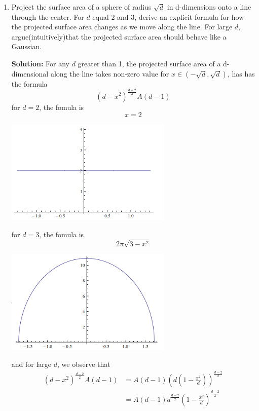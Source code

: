 \documentclass[a4paper, 12pt]{mcshw}
\begin{document}
    \begin{enumerate}
        \item Project the surface area of a sphere of radius $\sqrt{d}$ in d-dimensions onto a line through the center. For $d$ equal 2 and 3, derive an explicit formula for how the projected surface area changes as we move along the line. For large $d$, argue(intuitively)that the projected surface area should behave like a Gaussian.


            \textbf{Solution:} For any $d$ greater than 1, the projected surface area of a d-dimensional along the line takes non-zero value for $x \in (-\sqrt{d},\sqrt{d})$, has has the formula 
            $$
            {(d - x^2)}^{\frac{d-2}{2}}A(d-1)
            $$
            for $d=2$, the fomula is
            $$
            x=2
            $$
            \begin{center}
                \includegraphics[height=5cm]{1.png}
            \end{center}
            for $d=3$, the fomula is
            $$
            2\pi\sqrt{3 - x^2}
            $$
            \begin{center}
                \includegraphics[height=5cm]{2.png}
            \end{center}
            and for large $d$, we observe that
            \begin{align*}
                {(d - x^2)}^{\frac{d-2}{2}}A(d-1)&=A(d-1)(d(1-\frac{x^2}{d}))^{\frac{d-2}{2}}\\
                                                 &=A(d-1)d^{\frac{d-2}{2}}(1-\frac{x^2}{d})^{\frac{d-2}{2}}\\

\end{align*}
\end{enumerate}
\end{document}
